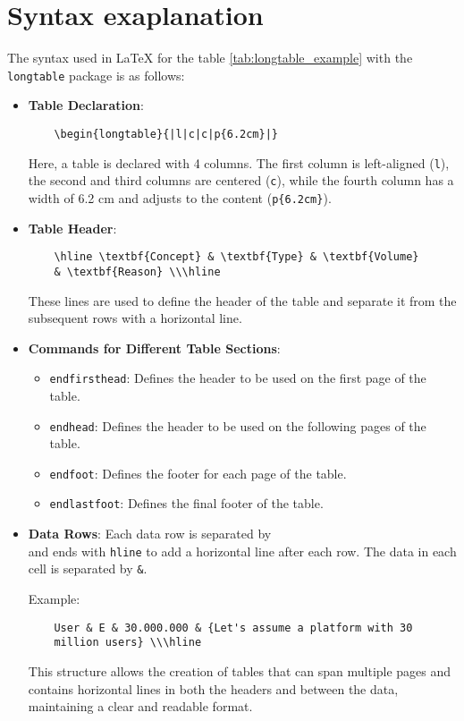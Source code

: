 \section{Syntax exaplanation}
The syntax used in LaTeX for the table \ref{tab:longtable_example} with the \texttt{longtable} package is as follows:

\begin{itemize}
    \item \textbf{Table Declaration}:
    \begin{verbatim}
    \begin{longtable}{|l|c|c|p{6.2cm}|}
    \end{verbatim}
    Here, a table is declared with 4 columns. The first column is left-aligned (\texttt{l}), the second and third columns are centered (\texttt{c}), while the fourth column has a width of 6.2 cm and adjusts to the content (\texttt{p\{6.2cm\}}).

    \item \textbf{Table Header}:
    \begin{verbatim}
    \hline \textbf{Concept} & \textbf{Type} & \textbf{Volume}
    & \textbf{Reason} \\\hline
    \end{verbatim}
    These lines are used to define the header of the table and separate it from the subsequent rows with a horizontal line.

    \item \textbf{Commands for Different Table Sections}:
    \begin{itemize}
        \item \texttt{endfirsthead}: Defines the header to be used on the first page of the table.
        \item \texttt{endhead}: Defines the header to be used on the following pages of the table.
        \item \texttt{endfoot}: Defines the footer for each page of the table.
        \item \texttt{endlastfoot}: Defines the final footer of the table.
    \end{itemize}

    \item \textbf{Data Rows}:
    Each data row is separated by \texttt{\\} and ends with \texttt{hline} to add a horizontal line after each row. The data in each cell is separated by \texttt{\&}.

    Example:
    \begin{verbatim}
    User & E & 30.000.000 & {Let's assume a platform with 30
    million users} \\\hline
    \end{verbatim}







    This structure allows the creation of tables that can span multiple pages and contains horizontal lines in both the headers and between the data, maintaining a clear and readable format.
\end{itemize}
